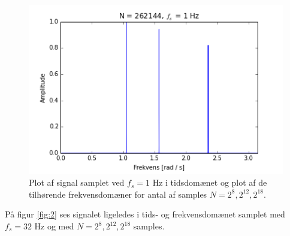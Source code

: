 \begin{figure}[H]
\begin{minipage}{0.49\textwidth}
\includegraphics[width=\textwidth]{figures/frekvensanalyse/freq_1hz_N262144.png}
\end{minipage}
\caption{Plot af signal samplet ved $f_s=1$ Hz i tidsdomænet og plot af de tilhørende frekvensdomæner for antal af samples $N = 2^8, 2^{12}, 2^{18}$.}
\label{fig:1}
\end{figure}

På figur \ref{fig:2} ses signalet ligeledes i tids- og frekvensdomænet samplet med $f_s=32$ Hz og med $N=2^8, 2^{12}, 2^{18}$ samples.

